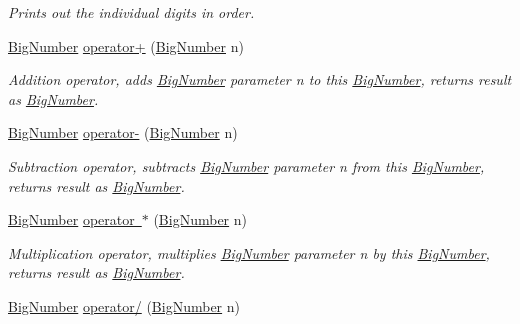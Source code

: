 \begin{DoxyCompactItemize}
\begin{DoxyCompactList}\small\item\em Prints out the individual digits in order. \end{DoxyCompactList}\item 
\mbox{\hyperlink{class_big_numbers_1_1_big_number}{Big\+Number}} \mbox{\hyperlink{class_big_numbers_1_1_big_number_a8eb596d9ee5374472a5d4ea14307532f}{operator+}} (\mbox{\hyperlink{class_big_numbers_1_1_big_number}{Big\+Number}} n)
\begin{DoxyCompactList}\small\item\em Addition operator, adds \mbox{\hyperlink{class_big_numbers_1_1_big_number}{Big\+Number}} parameter n to this \mbox{\hyperlink{class_big_numbers_1_1_big_number}{Big\+Number}}, returns result as \mbox{\hyperlink{class_big_numbers_1_1_big_number}{Big\+Number}}. \end{DoxyCompactList}\item 
\mbox{\hyperlink{class_big_numbers_1_1_big_number}{Big\+Number}} \mbox{\hyperlink{class_big_numbers_1_1_big_number_ae68c3d20272b34bb094fbf01181d1e48}{operator-\/}} (\mbox{\hyperlink{class_big_numbers_1_1_big_number}{Big\+Number}} n)
\begin{DoxyCompactList}\small\item\em Subtraction operator, subtracts \mbox{\hyperlink{class_big_numbers_1_1_big_number}{Big\+Number}} parameter n from this \mbox{\hyperlink{class_big_numbers_1_1_big_number}{Big\+Number}}, returns result as \mbox{\hyperlink{class_big_numbers_1_1_big_number}{Big\+Number}}. \end{DoxyCompactList}\item 
\mbox{\hyperlink{class_big_numbers_1_1_big_number}{Big\+Number}} \mbox{\hyperlink{class_big_numbers_1_1_big_number_abfba83c9a21a61d539a52d79a619584d}{operator $\ast$}} (\mbox{\hyperlink{class_big_numbers_1_1_big_number}{Big\+Number}} n)
\begin{DoxyCompactList}\small\item\em Multiplication operator, multiplies \mbox{\hyperlink{class_big_numbers_1_1_big_number}{Big\+Number}} parameter n by this \mbox{\hyperlink{class_big_numbers_1_1_big_number}{Big\+Number}}, returns result as \mbox{\hyperlink{class_big_numbers_1_1_big_number}{Big\+Number}}. \end{DoxyCompactList}\item 
\mbox{\hyperlink{class_big_numbers_1_1_big_number}{Big\+Number}} \mbox{\hyperlink{class_big_numbers_1_1_big_number_acc57df9ee3a6e3e94bec30df2eb22668}{operator/}} (\mbox{\hyperlink{class_big_numbers_1_1_big_number}{Big\+Number}} n)

\end{DoxyCompactItemize}
